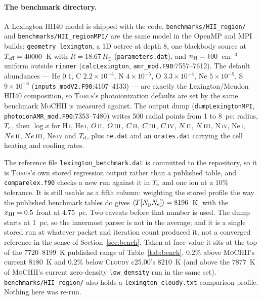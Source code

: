 \documentclass[english,a4paper]{my_memo}
\newcommand{\code}[1]{\texttt{#1}}
\newcommand{\MoCHII}{\textsc{MoCHII}}
\newcommand{\Cloudy}{\textsc{Cloudy}}
\newcommand{\Torus}{\textsc{Torus}}
\newcommand{\HI}{H\,\textsc{i}}
\newcommand{\HeI}{He\,\textsc{i}}
\newcommand{\OII}{O\,\textsc{ii}}
\newcommand{\OIII}{O\,\textsc{iii}}
\newcommand{\NII}{N\,\textsc{ii}}
\newcommand{\NIII}{N\,\textsc{iii}}
\newcommand{\CII}{C\,\textsc{ii}}
\newcommand{\CIII}{C\,\textsc{iii}}
\newcommand{\CIV}{C\,\textsc{iv}}
\newcommand{\NeII}{Ne\,\textsc{ii}}
\newcommand{\NeIII}{Ne\,\textsc{iii}}
\newcommand{\Te}{T_{\rm e}}
\newcommand{\nH}{n_{\rm H}}
\begin{document}
\paragraph{The benchmark directory.}  A Lexington HII40 model is shipped with
the code.  \code{benchmarks/HII\_region/} and \code{benchmarks/HII\_regionMPI/}
are the same model in the OpenMP and MPI builds: \code{geometry lexington}, a 1D octree
at depth 8, one blackbody source at $T_{\rm eff} = 40000$~K with
$R = 18.67\,R_\odot$ (\code{parameters.dat}), and $\nH = 100$~cm$^{-3}$ uniform
outside \code{rinner} (\code{calcLexington}, \code{amr\_mod.F90}:7557--7612).
The default abundances --- He $0.1$, C $2.2\times10^{-4}$, N $4\times10^{-5}$,
O $3.3\times10^{-4}$, Ne $5\times10^{-5}$, S $9\times10^{-6}$
(\code{inputs\_modV2.F90}:4107--4133) --- are exactly the Lexington/Meudon
HII40 composition, so \Torus{}'s photoionization defaults are set by the same
benchmark \MoCHII{} is measured against.  The output dump
(\code{dumpLexingtonMPI}, \code{photoionAMR\_mod.F90}:7353--7480) writes 500
radial points from 1 to 8~pc: radius, $\Te$, then $\log x$ for \HI{}, \HeI{},
$\OII{}$, $\OIII{}$, $\CII{}$, $\CIII{}$, $\CIV{}$, $\NII{}$, $\NIII{}$,
N\,\textsc{iv}, Ne\,\textsc{i}, $\NeII{}$, $\NeIII{}$, Ne\,\textsc{iv} and
$T_{\rm d}$, plus \code{ne.dat} and an \code{orates.dat} carrying the cell
heating and cooling rates.

The reference file \code{lexington\_benchmark.dat} is committed to the
repository, so it is \Torus{}'s own stored regression output rather than a
published table, and \code{comparelex.f90} checks a new run against it in
$\Te$ and one ion at a $10\%$ tolerance.  It is still usable as a fifth
column: weighting the stored profile the way the published benchmark tables do
gives $\langle T[N_{\rm p}N_{\rm e}]\rangle = 8196$~K, with the
$x_{\rm HI} = 0.5$ front at $4.75$~pc.  Two caveats before that number is
used.  The dump starts at 1~pc, so the innermost parsec is not in the average;
and it is a single stored run at whatever packet and iteration count produced
it, not a converged reference in the sense of Section~\ref{sec:bench}.  Taken
at face value it sits at the top of the $7720$--$8199$~K published range of
Table~\ref{tab:bench}, $0.2\%$ above \MoCHII{}'s current $8180$~K and $0.2\%$
below \Cloudy{} c25.00's $8210$~K (and above the $7877$~K of \MoCHII{}'s
current zero-density \code{low\_density} run in the same set).  \code{benchmarks/HII\_region/} also holds a
\code{lexington\_cloudy.txt} comparison profile.  Nothing here was re-run.
\end{document}
